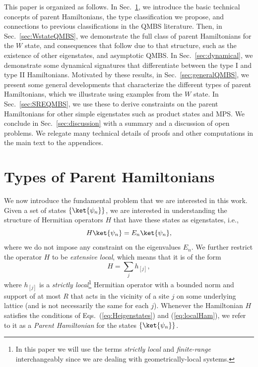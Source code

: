 \documentclass[prx,letterpaper,aps,superscriptaddress,floatfix,twocolumn,nofootinbib]{revtex4-2}
\theoremstyle{definition}
\begin{document}
%
This paper is organized as follows.
%
In Sec.~\ref{sec:QMBSgeneral}, we introduce the basic technical concepts of parent Hamiltonians, the type classification we propose, and connections to previous classifications in the QMBS literature.
%
Then, in Sec.~\ref{sec:WstateQMBS}, we demonstrate the full class of parent Hamiltonians for the $W$ state, and consequences that follow due to that structure, such as the existence of other eigenstates, and asymptotic QMBS.
%
In Sec.~\ref{sec:dynamical}, we demonstrate some dynamical signatures that differentiate between the type I and type II Hamiltonians.
%
Motivated by these results, in Sec.~\ref{sec:generalQMBS}, we present some general developments that characterize the different types of parent Hamiltonians, which we illustrate using examples from the $W$ state.
%
In Sec.~\ref{sec:SREQMBS}, we use these to derive constraints on the parent Hamiltonians for other simple eigenstates such as product states and MPS.
%
We conclude in Sec.~\ref{sec:discussion} with a summary and a discussion of open problems.
%
We relegate many technical details of proofs and other computations in the main text to the appendices.
%

%
\section{Types of Parent Hamiltonians}
\label{sec:QMBSgeneral}
%
We now introduce the fundamental problem that we are interested in this work. 
%
Given a set of states $\{\ket{\psi_{n}}\}$, we are interested in understanding the structure of Hermitian operators $H$ that have these states as eigenstates, i.e.,
\begin{equation}
    H\ket{\psi_{n}} = E_n \ket{\psi_{n}},
\label{eq:Heigenstates}
\end{equation}
where we do not impose any constraint on the eigenvalues $E_n$. 
%
We further restrict the operator $H$ to be \textit{extensive local}, which means that it is of the form
\begin{equation}
    H = \sum_{j}{h_{[j]}}, 
\label{eq:localHam}
\end{equation}
where $h_{[j]}$ is a \textit{strictly local}\footnote{In this paper we will use the terms \textit{strictly local} and \textit{finite-range} interchangeably since we are dealing with geometrically-local systems.} 
Hermitian operator with a bounded norm and support of at most $R$ that acts in the vicinity of a site $j$ on some underlying lattice (and is not necessarily the same for each $j$).
%
Whenever the Hamiltonian $H$ satisfies the conditions of Eqs.~(\ref{eq:Heigenstates}) and (\ref{eq:localHam}), we refer to it as a \textit{Parent Hamiltonian} for the states $\{\ket{\psi_n}\}$.
%
\end{document}
